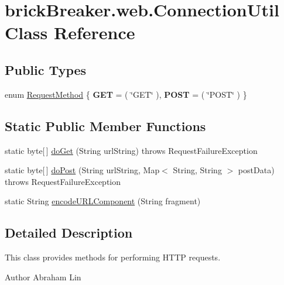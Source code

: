 \hypertarget{classbrick_breaker_1_1web_1_1_connection_util}{
\section{brickBreaker.web.ConnectionUtil Class Reference}
\label{classbrick_breaker_1_1web_1_1_connection_util}
}
\subsection*{Public Types}
\begin{DoxyCompactItemize}
\item 
enum \hyperlink{classbrick_breaker_1_1web_1_1_connection_util_a2f1cc93d9583cfc78cb27b62c7f1359a}{RequestMethod} \{ {\bfseries GET} = ( \char`\"{}GET\char`\"{} ), 
{\bfseries POST} = ( \char`\"{}POST\char`\"{} )
 \}
\end{DoxyCompactItemize}
\subsection*{Static Public Member Functions}
\begin{DoxyCompactItemize}
\item 
static byte\mbox{[}$\,$\mbox{]} \hyperlink{classbrick_breaker_1_1web_1_1_connection_util_a30e5317eb7d69805c2ea0be2e958d1f5}{doGet} (String urlString)  throws RequestFailureException 
\item 
static byte\mbox{[}$\,$\mbox{]} \hyperlink{classbrick_breaker_1_1web_1_1_connection_util_a14b57ed9409efdc30cb80f83202c4dae}{doPost} (String urlString, Map$<$ String, String $>$ postData)  throws RequestFailureException 
\item 
static String \hyperlink{classbrick_breaker_1_1web_1_1_connection_util_a0b446e1652608c958695ea1e258f2e9b}{encodeURLComponent} (String fragment)
\end{DoxyCompactItemize}


\subsection{Detailed Description}
This class provides methods for performing HTTP requests.

\begin{DoxyAuthor}{Author}
Abraham Lin 
\end{DoxyAuthor}


